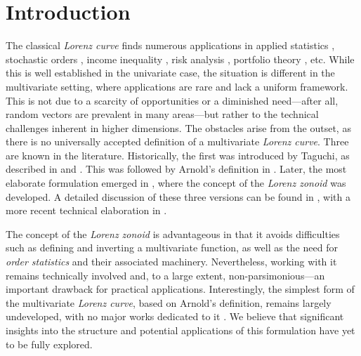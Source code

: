 \documentclass[onecolumn]{article}
\begin{document}
\section{\protect\Large Introduction}

\bigskip The classical \textit{Lorenz curve} finds numerous applications in
applied statistics \cite{[2]}, stochastic orders \cite{[1]}, income
inequality \cite{[10]}, risk analysis \cite{[5]}, portfolio theory \cite%
{[43]}, etc. While this is well established in the univariate case, the
situation is different in the multivariate setting, where applications are
rare and lack a uniform framework. This is not due to a scarcity of
opportunities or a diminished need---after all, random vectors are prevalent
in many areas---but rather to the technical challenges inherent in higher
dimensions. The obstacles arise from the outset, as there is no universally
accepted definition of a multivariate \textit{Lorenz curve}. Three are known
in the literature. Historically, the first was introduced by Taguchi, as
described in \cite{[7]} and \cite{[8]}. This was followed by Arnold's
definition in \cite{[4]}. Later, the most elaborate formulation emerged in 
\cite{[9]}, where the concept of the \textit{Lorenz zonoid} was developed. A
detailed discussion of these three versions can be found in \cite{[2]}, with
a more recent technical elaboration in \cite{[6]}.

The concept of the \textit{Lorenz zonoid} is advantageous in that it avoids
difficulties such as defining and inverting a multivariate function, as well
as the need for \textit{order statistics} and their associated machinery.
Nevertheless, working with it remains technically involved and, to a large
extent, non-parsimonious---an important drawback for practical applications.
Interestingly, the simplest form of the multivariate \textit{Lorenz curve},
based on Arnold's definition, remains largely undeveloped, with no major
works dedicated to it \cite{[6]}. We believe that significant insights into
the structure and potential applications of this formulation have yet to be
fully explored.
\end{document}
